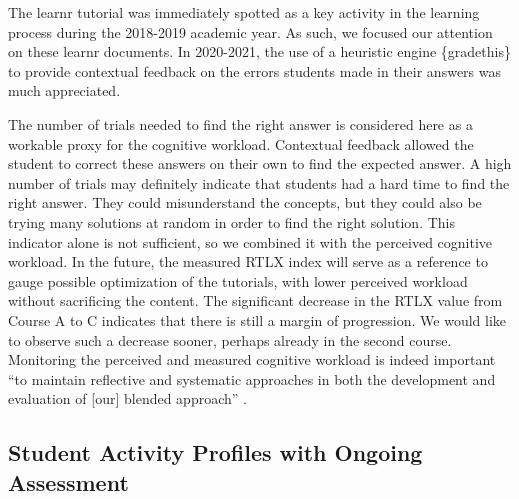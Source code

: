 \documentclass{aims}
\theoremstyle{definition}
\begin{document}
The learnr tutorial was immediately spotted as a key activity in the
learning process during the 2018-2019 academic year. As such, we focused
our attention on these learnr documents. In 2020-2021, the use of a
heuristic engine \{gradethis\} to provide contextual feedback on the
errors students made in their answers was much appreciated.

The number of trials needed to find the right answer is considered here
as a workable proxy for the cognitive workload. Contextual feedback
allowed the student to correct these answers on their own to find the
expected answer. A high number of trials may definitely indicate that
students had a hard time to find the right answer. They could
misunderstand the concepts, but they could also be trying many solutions
at random in order to find the right solution. This indicator alone is
not sufficient, so we combined it with the perceived cognitive workload.
In the future, the measured RTLX index will serve as a reference to
gauge possible optimization of the tutorials, with lower perceived
workload without sacrificing the content. The significant decrease in
the RTLX value from Course A to C indicates that there is still a margin
of progression. We would like to observe such a decrease sooner, perhaps
already in the second course. Monitoring the perceived and measured
cognitive workload is indeed important ``to maintain reflective and
systematic approaches in both the development and evaluation of
{[}our{]} blended approach'' \cite{Spadafora2018}.

\hypertarget{student-activity-profiles-with-ongoing-assessment-1}{%
\subsection{Student Activity Profiles with Ongoing
Assessment}\label{student-activity-profiles-with-ongoing-assessment-1}}
\end{document}
